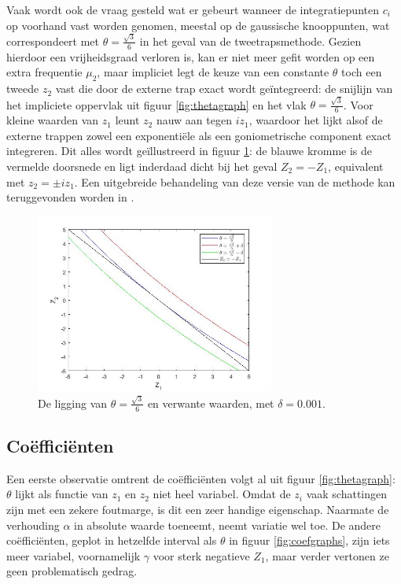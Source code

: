 \documentclass[12pt]{article}
\begin{document}
Vaak wordt ook de vraag gesteld wat er gebeurt wanneer de integratiepunten \(c_i\) op voorhand vast worden genomen, meestal op de gaussische knooppunten, wat correspondeert met \(\theta=\frac{\sqrt{3}}{6}\) in het geval van de tweetrapsmethode. Gezien hierdoor een vrijheidsgraad verloren is, kan er niet meer gefit worden op een extra frequentie \(\mu_2\), maar impliciet legt de keuze van een constante \(\theta\) toch een tweede \(z_2\) vast die door de externe trap exact wordt geïntegreerd: de snijlijn van het impliciete oppervlak uit figuur \ref{fig:thetagraph} en het vlak \(\theta=\frac{\sqrt{3}}{6}\). Voor kleine waarden van \(z_1\) leunt \(z_2\) nauw aan tegen \(iz_1\), waardoor het lijkt alsof de externe trappen zowel een exponentiële als een goniometrische component exact integreren. Dit alles wordt geïllustreerd in figuur \ref{fig:consthetarks2}: de blauwe kromme is de vermelde doorsnede en ligt inderdaad dicht bij het geval \(Z_2=-Z_1\), equivalent met \(z_2=\pm iz_1\). Een uitgebreide behandeling van deze versie van de methode kan teruggevonden worden in \cite{4thordersympl}.
\begin{figure}[H]
    \centering
    \includegraphics[width=0.7\textwidth]{cons_theta_RKs2.jpg}
    \caption{De ligging van \(\theta=\frac{\sqrt{3}}{6}\) en verwante waarden, met \(\delta=0.001\).}
    \label{fig:consthetarks2}
\end{figure}

\subsection{Coëfficiënten} \label{subsec:coeff}
Een eerste observatie omtrent de coëfficiënten volgt al uit figuur \ref{fig:thetagraph}: \(\theta\) lijkt als functie van \(z_1\) en \(z_2\) niet heel variabel. Omdat de \(z_i\) vaak schattingen zijn met een zekere foutmarge, is dit een zeer handige eigenschap. Naarmate de verhouding \(\alpha\) in absolute waarde toeneemt, neemt variatie wel toe. De andere coëfficiënten, geplot in hetzelfde interval als \(\theta\) in figuur \ref{fig:coefgraphs}, zijn iets meer variabel, voornamelijk \(\gamma\) voor sterk negatieve \(Z_1\), maar verder vertonen ze geen problematisch gedrag. 
\end{document}
